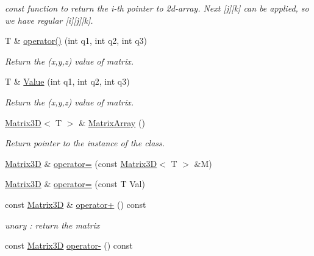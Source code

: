 \begin{DoxyCompactItemize}
\begin{DoxyCompactList}\small\item\em const function to return the i-\/th pointer to 2d-\/array. Next \mbox{[}j\mbox{]}\mbox{[}k\mbox{]} can be applied, so we have regular \mbox{[}i\mbox{]}\mbox{[}j\mbox{]}\mbox{[}k\mbox{]}. \end{DoxyCompactList}\item 
T \& \hyperlink{class_matrix3_d_a6e52e634897ee731afd0ec4d4b80ddbd}{operator()} (int q1, int q2, int q3)
\begin{DoxyCompactList}\small\item\em Return the (x,y,z) value of matrix. \end{DoxyCompactList}\item 
\hypertarget{class_matrix3_d_a4d44737ab4e818c43149e539223d03f5}{}T \& \hyperlink{class_matrix3_d_a4d44737ab4e818c43149e539223d03f5}{Value} (int q1, int q2, int q3)\label{class_matrix3_d_a4d44737ab4e818c43149e539223d03f5}

\begin{DoxyCompactList}\small\item\em Return the (x,y,z) value of matrix. \end{DoxyCompactList}\item 
\hypertarget{class_matrix3_d_a27520e5d0fdbeb9208c3b41e3236a5ea}{}\hyperlink{class_matrix3_d}{Matrix3\+D}$<$ T $>$ \& \hyperlink{class_matrix3_d_a27520e5d0fdbeb9208c3b41e3236a5ea}{Matrix\+Array} ()\label{class_matrix3_d_a27520e5d0fdbeb9208c3b41e3236a5ea}

\begin{DoxyCompactList}\small\item\em Return pointer to the instance of the class. \end{DoxyCompactList}\item 
\hyperlink{class_matrix3_d}{Matrix3\+D} \& \hyperlink{class_matrix3_d_af88a2888ea9aadc99b66051aa4540a91}{operator=} (const \hyperlink{class_matrix3_d}{Matrix3\+D}$<$ T $>$ \&M)
\item 
\hyperlink{class_matrix3_d}{Matrix3\+D} \& \hyperlink{class_matrix3_d_ac7a5828927adbd5ff83b07f08eb68026}{operator=} (const T Val)
\item 
\hypertarget{class_matrix3_d_ad420d5dc6ea8726840b0186cce31b2af}{}const \hyperlink{class_matrix3_d}{Matrix3\+D} \& \hyperlink{class_matrix3_d_ad420d5dc6ea8726840b0186cce31b2af}{operator+} () const \label{class_matrix3_d_ad420d5dc6ea8726840b0186cce31b2af}

\begin{DoxyCompactList}\small\item\em unary \+: return the matrix \end{DoxyCompactList}\item 
\hypertarget{class_matrix3_d_a503a3adb6c1a4eae64cd0c883bf17c98}{}const \hyperlink{class_matrix3_d}{Matrix3\+D} \hyperlink{class_matrix3_d_a503a3adb6c1a4eae64cd0c883bf17c98}{operator-\/} () const \label{class_matrix3_d_a503a3adb6c1a4eae64cd0c883bf17c98}


\end{DoxyCompactItemize}
